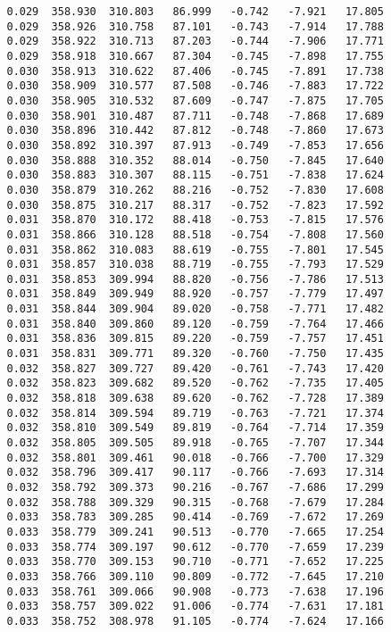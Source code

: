 \begin{verbatim}
   0.029  358.930  310.803   86.999   -0.742   -7.921   17.805
   0.029  358.926  310.758   87.101   -0.743   -7.914   17.788
   0.029  358.922  310.713   87.203   -0.744   -7.906   17.771
   0.029  358.918  310.667   87.304   -0.745   -7.898   17.755
   0.030  358.913  310.622   87.406   -0.745   -7.891   17.738
   0.030  358.909  310.577   87.508   -0.746   -7.883   17.722
   0.030  358.905  310.532   87.609   -0.747   -7.875   17.705
   0.030  358.901  310.487   87.711   -0.748   -7.868   17.689
   0.030  358.896  310.442   87.812   -0.748   -7.860   17.673
   0.030  358.892  310.397   87.913   -0.749   -7.853   17.656
   0.030  358.888  310.352   88.014   -0.750   -7.845   17.640
   0.030  358.883  310.307   88.115   -0.751   -7.838   17.624
   0.030  358.879  310.262   88.216   -0.752   -7.830   17.608
   0.030  358.875  310.217   88.317   -0.752   -7.823   17.592
   0.031  358.870  310.172   88.418   -0.753   -7.815   17.576
   0.031  358.866  310.128   88.518   -0.754   -7.808   17.560
   0.031  358.862  310.083   88.619   -0.755   -7.801   17.545
   0.031  358.857  310.038   88.719   -0.755   -7.793   17.529
   0.031  358.853  309.994   88.820   -0.756   -7.786   17.513
   0.031  358.849  309.949   88.920   -0.757   -7.779   17.497
   0.031  358.844  309.904   89.020   -0.758   -7.771   17.482
   0.031  358.840  309.860   89.120   -0.759   -7.764   17.466
   0.031  358.836  309.815   89.220   -0.759   -7.757   17.451
   0.031  358.831  309.771   89.320   -0.760   -7.750   17.435
   0.032  358.827  309.727   89.420   -0.761   -7.743   17.420
   0.032  358.823  309.682   89.520   -0.762   -7.735   17.405
   0.032  358.818  309.638   89.620   -0.762   -7.728   17.389
   0.032  358.814  309.594   89.719   -0.763   -7.721   17.374
   0.032  358.810  309.549   89.819   -0.764   -7.714   17.359
   0.032  358.805  309.505   89.918   -0.765   -7.707   17.344
   0.032  358.801  309.461   90.018   -0.766   -7.700   17.329
   0.032  358.796  309.417   90.117   -0.766   -7.693   17.314
   0.032  358.792  309.373   90.216   -0.767   -7.686   17.299
   0.032  358.788  309.329   90.315   -0.768   -7.679   17.284
   0.033  358.783  309.285   90.414   -0.769   -7.672   17.269
   0.033  358.779  309.241   90.513   -0.770   -7.665   17.254
   0.033  358.774  309.197   90.612   -0.770   -7.659   17.239
   0.033  358.770  309.153   90.710   -0.771   -7.652   17.225
   0.033  358.766  309.110   90.809   -0.772   -7.645   17.210
   0.033  358.761  309.066   90.908   -0.773   -7.638   17.196
   0.033  358.757  309.022   91.006   -0.774   -7.631   17.181
   0.033  358.752  308.978   91.105   -0.774   -7.624   17.166

\end{verbatim}
